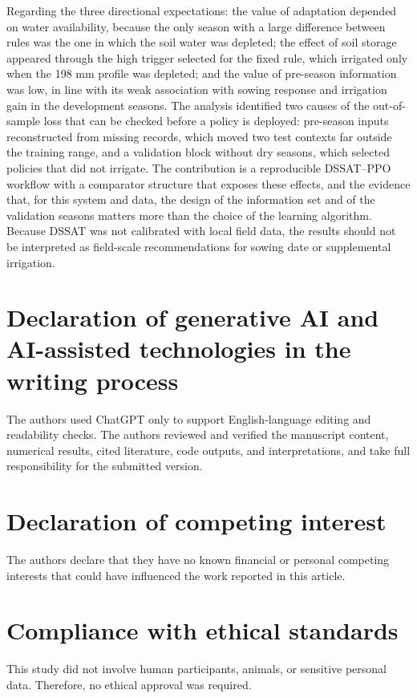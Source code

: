 \documentclass[times,final,authoryear]{elsarticle}
\begin{document}
Regarding the three directional expectations: the value of adaptation depended on water availability, because the only season with a large difference between rules was the one in which the soil water was depleted; the effect of soil storage appeared through the high trigger selected for the fixed rule, which irrigated only when the 198 mm profile was depleted; and the value of pre-season information was low, in line with its weak association with sowing response and irrigation gain in the development seasons. The analysis identified two causes of the out-of-sample loss that can be checked before a policy is deployed: pre-season inputs reconstructed from missing records, which moved two test contexts far outside the training range, and a validation block without dry seasons, which selected policies that did not irrigate. The contribution is a reproducible DSSAT--PPO workflow with a comparator structure that exposes these effects, and the evidence that, for this system and data, the design of the information set and of the validation seasons matters more than the choice of the learning algorithm. Because DSSAT was not calibrated with local field data, the results should not be interpreted as field-scale recommendations for sowing date or supplemental irrigation.
\section*{Declaration of generative AI and AI-assisted technologies in the writing process}

The authors used ChatGPT only to support English-language editing and readability checks. The authors reviewed and verified the manuscript content, numerical results, cited literature, code outputs, and interpretations, and take full responsibility for the submitted version.

\section*{Declaration of competing interest}
The authors declare that they have no known financial or personal competing interests that could have influenced the work reported in this article.

\section*{Compliance with ethical standards}
This study did not involve human participants, animals, or sensitive personal data. Therefore, no ethical approval was required.
\end{document}

